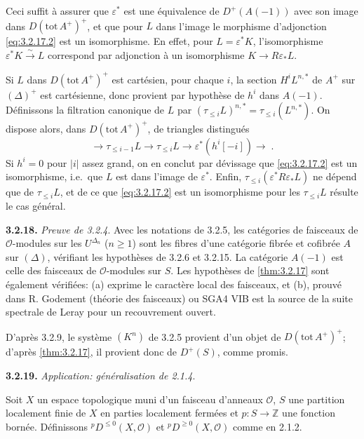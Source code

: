 \documentclass[12pt,a4paper]{article}
\theoremstyle{plain}
\theoremstyle{definition}
\newcommand{\cO}{\mathcal{O}}
\newcommand{\isom}{\xrightarrow{\sim}}
\providecommand{\cO}{\mathcal{O}}
\begin{document}
Ceci suffit \`{a} assurer que $\varepsilon^{*}$ est une \'{e}quivalence de $D^{+}(A(-1))$ avec son image dans $D(\mathrm{tot}\, A^{+})^{+}$, et que pour $L$ dans l'image le morphisme d'adjonction \eqref{eq:3.2.17.2} est un isomorphisme. En effet, pour $L = \varepsilon^{*}K$, l'isomorphisme $\varepsilon^{*}K \isom L$ correspond par adjonction \`{a} un isomorphisme $K \longrightarrow R\varepsilon_{*}L$.

Si $L$ dans $D(\mathrm{tot}\, A^{+})^{+}$ est cart\'{e}sien, pour chaque $i$, la section $H^{i}L^{n,*}$ de $A^{+}$ sur $(\Delta)^{+}$ est cart\'{e}sienne, donc provient par hypoth\`{e}se de $h^{i}$ dans $A(-1)$. D\'{e}finissons la filtration canonique de $L$ par $(\tau_{\leq i}L)^{n,*} = \tau_{\leq i}(L^{n,*})$. On dispose alors, dans $D(\mathrm{tot}\, A^{+})^{+}$, de triangles distingu\'{e}s
\[
\longrightarrow \tau_{\leq i-1}L \longrightarrow \tau_{\leq i}L \longrightarrow \varepsilon^{*}(h^{i}[-i]) \longrightarrow\;.
\]
Si $h^{i} = 0$ pour $|i|$ assez grand, on en conclut par d\'{e}vissage que \eqref{eq:3.2.17.2} est un isomorphisme, i.e.\ que $L$ est dans l'image de $\varepsilon^{*}$. Enfin, $\tau_{\leq i}(\varepsilon^{*}R\varepsilon_{*}L)$ ne d\'{e}pend que de $\tau_{\leq i}L$, et de ce que \eqref{eq:3.2.17.2} est un isomorphisme pour les $\tau_{\leq i}L$ r\'{e}sulte le cas g\'{e}n\'{e}ral.

\noindent\textbf{3.2.18.} \emph{Preuve de \emph{3.2.4}}. Avec les notations de 3.2.5, les cat\'{e}gories de faisceaux de $\cO$-modules sur les $U^{\Delta_{n}}$ ($n \geq 1$) sont les fibres d'une cat\'{e}gorie fibr\'{e}e et cofibr\'{e}e $A$ sur $(\Delta)$, v\'{e}rifiant les hypoth\`{e}ses de 3.2.6 et 3.2.15. La cat\'{e}gorie $A(-1)$ est celle des faisceaux de $\cO$-modules sur $S$. Les hypoth\`{e}ses de \ref{thm:3.2.17} sont \'{e}galement v\'{e}rifi\'{e}es: (a) exprime le caract\`{e}re local des faisceaux, et (b), prouv\'{e} dans R. Godement (th\'{e}orie des faisceaux) ou SGA4 VIB est la source de la suite spectrale de Leray pour un recouvrement ouvert.

D'apr\`{e}s 3.2.9, le syst\`{e}me $(K^{n})$ de 3.2.5 provient d'un objet de $D(\mathrm{tot}\, A^{+})^{+}$; d'apr\`{e}s \ref{thm:3.2.17}, il provient donc de $D^{+}(S)$, comme promis.

\noindent\textbf{3.2.19.} \emph{Application: g\'{e}n\'{e}ralisation de \emph{2.1.4}}.

Soit $X$ un espace topologique muni d'un faisceau d'anneaux $\cO$, $S$ une partition localement finie de $X$ en parties localement ferm\'{e}es et $p: S \to \mathbb{Z}$ une fonction born\'{e}e. D\'{e}finissons ${}^{p}D^{\leq 0}(X,\cO)$ et ${}^{p}D^{\geq 0}(X,\cO)$ comme en 2.1.2.
\end{document}
